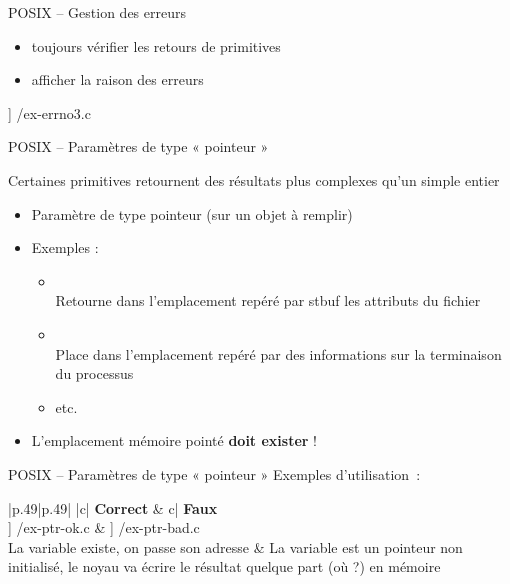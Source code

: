 \begin {frame} {POSIX -- Gestion des erreurs}
    \begin {block} {}
    \begin {itemize}
	\item \alert {toujours vérifier} les retours de primitives
	\item \alert {afficher} la raison des erreurs
    \end {itemize}
    \end {block}

    \fD\lstmonstyle] {\inc/ex-errno3.c}
\end {frame}

\begin {frame} {POSIX -- Paramètres de type « pointeur »}

    Certaines primitives retournent des résultats plus complexes
    qu'un simple entier

    \begin {itemize}
	\item Paramètre de type pointeur (sur un objet à remplir)
	\item Exemples :
	    \begin {itemize}
		\item {}
		    \\
		    Retourne dans l'emplacement repéré par \code
		    {\alert {stbuf}} les attributs du fichier
		\item {}
		    \\
		    Place dans l'emplacement repéré par  des informations sur la terminaison du
		    processus
		\item etc.
	    \end {itemize}

	\item L'emplacement mémoire pointé \textbf {doit exister} !
    \end {itemize}
\end {frame}

\begin {frame} {POSIX -- Paramètres de type « pointeur »}
    Exemples d'utilisation~:

    \ctableau {\fC} {|p{.49\textwidth}|p{.49\textwidth}|} {
	\rc {} {|c|} {\textbf {Correct}}
	    &  {c|} {\textbf {\alert {Faux}}}
	    \\ \hline
	\rc \fE\lstmonstyle] {\inc/ex-ptr-ok.c}
	    &
	    \fE\lstmonstyle] {\inc/ex-ptr-bad.c}
	    \\
	\rc La variable  existe, on passe son adresse
	    & La variable  est un pointeur non initialisé,
		le noyau va écrire le résultat quelque part (où ?) en
		mémoire
	    \\
    }

\end {frame}
